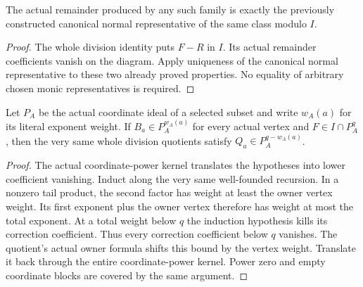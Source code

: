 \begin{theorem}
\label{hir:actual-monic-family-canonical-remainder}
\leanok
The actual remainder produced by any such family is exactly the previously
constructed canonical normal representative of the same class modulo $I$.
\end{theorem}
\begin{proof}
The whole division identity puts $F-R$ in $I$. Its actual remainder
coefficients vanish on the diagram. Apply uniqueness of the canonical
normal representative to these two already proved properties. No equality
of arbitrary chosen monic representatives is required.
\end{proof}

\begin{theorem}
\label{hir:actual-monic-family-centre-power-division}
\leanok
Let $P_A$ be the actual coordinate ideal of a selected subset and write
$w_A(a)$ for its literal exponent weight. If $B_a\in P_A^{w_A(a)}$
for every actual vertex and $F\in I\cap P_A^q$, then the very same whole
division quotients satisfy $Q_a\in P_A^{q-w_A(a)}$.
\end{theorem}
\begin{proof}
The actual coordinate-power kernel translates the hypotheses into lower
coefficient vanishing. Induct along the very same well-founded recursion.
In a nonzero tail product, the second factor has weight at least the
owner vertex weight. Its first exponent plus the owner vertex therefore
has weight at most the total exponent. At a total weight below $q$ the
induction hypothesis kills its correction coefficient. Thus every
correction coefficient below $q$ vanishes. The quotient's actual owner
formula shifts this bound by the vertex weight. Translate it back through
the entire coordinate-power kernel. Power zero and empty coordinate blocks
are covered by the same argument.
\end{proof}

